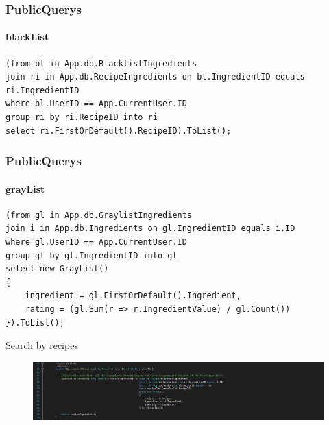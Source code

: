 \begin{frame}[fragile]
\frametitle{PublicQuerys}
\framesubtitle{blackList}
\fontsize{8pt}{7}\selectfont
\begin{lstlisting}
(from bl in App.db.BlacklistIngredients
join ri in App.db.RecipeIngredients on bl.IngredientID equals ri.IngredientID
where bl.UserID == App.CurrentUser.ID
group ri by ri.RecipeID into ri
select ri.FirstOrDefault().RecipeID).ToList();
\end{lstlisting}
\end{frame}

\begin{frame}[fragile]
\frametitle{PublicQuerys}
\framesubtitle{grayList}
\fontsize{8pt}{7}\selectfont
\begin{lstlisting}
(from gl in App.db.GraylistIngredients
join i in App.db.Ingredients on gl.IngredientID equals i.ID
where gl.UserID == App.CurrentUser.ID
group gl by gl.IngredientID into gl
select new GrayList()
{
    ingredient = gl.FirstOrDefault().Ingredient,
    rating = (gl.Sum(r => r.IngredientValue) / gl.Count())
}).ToList();
\end{lstlisting}
\end{frame}







\begin{frame}{Search by recipes}
    \begin{figure}
        \centering
        \includegraphics[width=\textwidth]{Grafik/search}
    \end{figure}
\end{frame}

